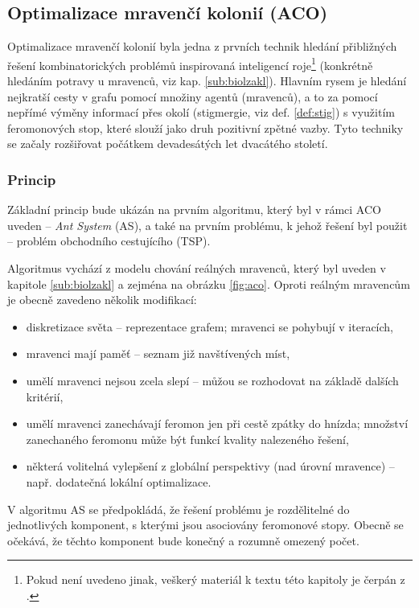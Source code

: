 \documentclass[a4paper,12pt]{article}
\begin{document}
\subsection{Optimalizace mravenčí kolonií (ACO)}
Optimalizace mravenčí kolonií byla jedna z prvních technik hledání přibližných řešení kombinatorických
problémů inspirovaná inteligencí roje\footnote{Pokud není uvedeno jinak, veškerý materiál k textu této kapitoly
je čerpán z \cite{Blum08SwarmOpt}.} (konkrétně hledáním potravy u mravenců, viz kap. \ref{sub:biolzakl}).
Hlavním rysem je hledání nejkratší cesty v grafu pomocí množiny agentů (mravenců), a to za pomocí nepřímé výměny
informací přes okolí (stigmergie, viz def. \ref{def:stig}) s využitím feromonových stop, které slouží jako druh
pozitivní zpětné vazby. Tyto techniky se začaly rozšiřovat počátkem devadesátých let dvacátého století.

\subsubsection{Princip}
Základní princip bude ukázán na prvním algoritmu, který byl v rámci ACO uveden -- {\it Ant System} (AS), a také
na prvním problému, k jehož řešení byl použit -- problém obchodního cestujícího (TSP).

Algoritmus vychází z modelu chování reálných mravenců, který byl uveden v kapitole \ref{sub:biolzakl} a zejména
na obrázku \ref{fig:aco}. Oproti reálným mravencům je obecně zavedeno několik modifikací:
\begin{itemize}
  \item diskretizace světa -- reprezentace grafem; mravenci se pohybují v iteracích,
  \item mravenci mají paměť -- seznam již navštívených míst,
  \item umělí mravenci nejsou zcela slepí -- můžou se rozhodovat na základě dalších kritérií, %
  \item umělí mravenci zanechávají feromon jen při cestě zpátky do hnízda; množství zanechaného feromonu může
        být funkcí kvality nalezeného řešení, 
  \item některá volitelná vylepšení z globální perspektivy (nad úrovní mravence) -- např. dodatečná
        lokální optimalizace.
\end{itemize}

V algoritmu AS se předpokládá, že řešení problému je rozdělitelné do jednotlivých komponent, s kterými jsou
asociovány feromonové stopy. Obecně se očekává, že těchto komponent bude konečný a rozumně omezený počet.
\end{document}
